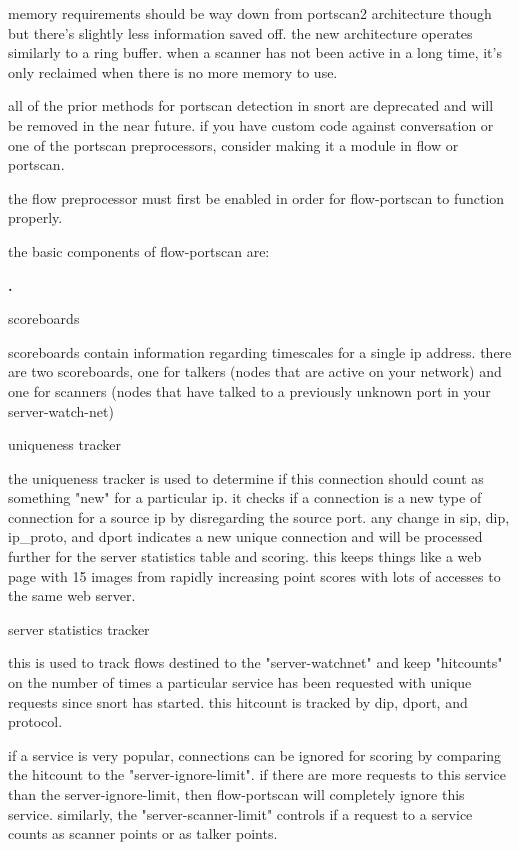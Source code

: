 \documentclass[english]{report}
\newcounter{slistnum}
\newenvironment{slist}{
    \begin{list}{
        {
            \bf \arabic{slistnum}.
        } 
    }{
        \usecounter{slistnum} 
    }
}{
    \end{list} 
}
\begin{document}
memory requirements should be way down from portscan2 architecture though but
there's slightly less information saved off.  the new architecture operates
similarly to a ring buffer.  when a scanner has not been active in a long time,
it's only reclaimed when there is no more memory to use.

all of the prior methods for portscan detection in snort are deprecated and
will be removed in the near future.  if you have custom code against
conversation or one of the portscan preprocessors, consider making it a module
in flow or portscan.

the flow preprocessor must first be enabled in order for flow-portscan to
function properly.

the basic components of flow-portscan are:
\begin{slist}
\item scoreboards

scoreboards contain information regarding timescales for a single ip address.  there are two scoreboards, one for talkers (nodes that are active on your network) and one for scanners (nodes that have talked to a previously unknown port in your server-watch-net) 
\item uniqueness tracker

the uniqueness tracker is used to determine if this connection should count as something "new" for a particular ip.  it checks if a connection is a new type of connection for a source ip by disregarding the source port.  any change in sip, dip, ip\_proto, and dport indicates a new unique connection and will be processed further for the server statistics table and scoring.  this keeps things like a web page with 15 images from rapidly increasing point scores with lots of accesses to the same web server.
\item server statistics tracker

this is used to track flows destined to the "server-watchnet" and keep "hitcounts" on the number of times a particular service has been requested with unique requests since snort has started.  this hitcount is tracked by dip, dport, and protocol.
\end{slist}

if a service is very popular, connections can be ignored for scoring by
comparing the hitcount to the "server-ignore-limit". if there are more requests
to this service than the server-ignore-limit, then flow-portscan will
completely ignore this service.  similarly, the "server-scanner-limit" controls
if a request to a service counts as scanner points or as talker points.
\end{document}
